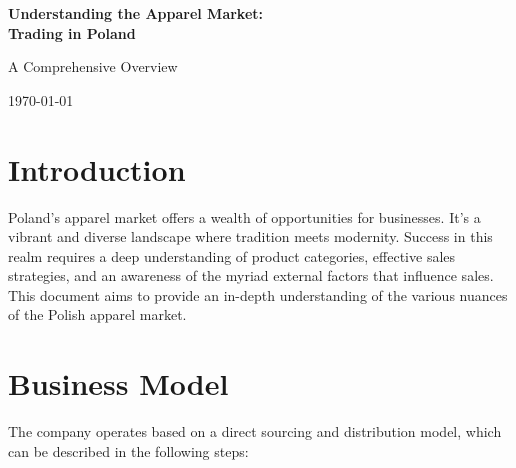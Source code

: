 \documentclass{article}
\begin{document}
\begin{titlepage}
    \centering
    \vspace*{4cm}
    {\Huge\bfseries Understanding the Apparel Market: \\ Trading in Poland \par}
    \vspace{2cm}
    {\large A Comprehensive Overview \par}
    \vfill
    \vspace{2cm}
    {\large \today\par}
\end{titlepage}

\newpage
\tableofcontents
\newpage    

\section{Introduction}
Poland's apparel market offers a wealth of opportunities for businesses. It's a vibrant and diverse landscape where tradition meets modernity. Success in this realm requires a deep understanding of product categories, effective sales strategies, and an awareness of the myriad external factors that influence sales. This document aims to provide an in-depth understanding of the various nuances of the Polish apparel market.

\section{Business Model}

The company operates based on a direct sourcing and distribution model, which can be described in the following steps:
\end{document}
